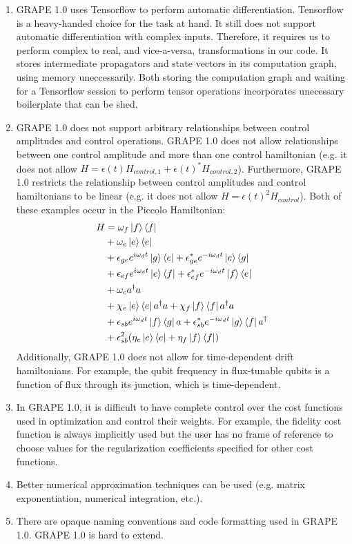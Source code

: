 \documentclass[letterpaper, 12pt]{article}
\begin{document}
\begin{enumerate}
\item GRAPE 1.0 uses Tensorflow to perform automatic differentiation. Tensorflow is a heavy-handed choice for the task at hand. It still does not support automatic differentiation with complex inputs. Therefore, it requires us to perform complex to real, and vice-a-versa, transformations in our code. It stores intermediate propagators and state vectors in its computation graph, using memory uneccessarily. Both storing the computation graph and waiting for a Tensorflow session to perform tensor operations incorporates unecessary boilerplate that can be shed.
  
\item GRAPE 1.0 does not support arbitrary relationships between control amplitudes and control operations. GRAPE 1.0 does not allow relationships between one control amplitude and more than one control hamiltonian (e.g. it does not allow $H = \epsilon(t)H_{control, 1} + \epsilon(t)^{*}H_{control, 2}$). Furthermore, GRAPE 1.0 restricts the relationship between control amplitudes and control hamiltonians to be linear (e.g. it does not allow $H = \epsilon(t)^{2}H_{control}$). Both of these examples occur in the Piccolo Hamiltonian:
\begin{align*}
  H &= \omega_{f}\ket{f}\bra{f} \\
  &+ \omega_{e}\ket{e}\bra{e}\\
  &+ \epsilon_{ge}e^{i\omega_{d}t}\ket{g}\bra{e} + \epsilon_{ge}^{*}e^{-i\omega_{d}t}\ket{e}\bra{g}\\
  &+ \epsilon_{ef}e^{i\omega_{d}t}\ket{e}\bra{f} + \epsilon_{ef}^{*}e^{-i\omega_{d}t}\ket{f}\bra{e}\\
  &+ \omega_{c}a^{\dagger}a\\
  &+ \chi_{e}\ket{e}\bra{e}a^{\dagger}a + \chi_{f}\ket{f}\bra{f}a^{\dagger}a\\
  &+ \epsilon_{sb}e^{i\omega_{d}t}\ket{f}\bra{g}a + \epsilon_{sb}^{*}e^{-i\omega_{d}t}\ket{g}\bra{f}a^{\dagger}\\
  &+ \epsilon_{sb}^{2}(\eta_{e}\ket{e}\bra{e} + \eta_{f}\ket{f}\bra{f})\\
\end{align*}
  Additionally, GRAPE 1.0 does not allow for time-dependent drift hamiltonians. For example, the qubit frequency in flux-tunable qubits is a function of flux through its junction, which is time-dependent.

\item In GRAPE 1.0, it is difficult to have complete control over the cost functions used in optimization and control their weights. For example, the fidelity cost function is always implicitly used but the user has no frame of reference to choose values for the regularization coefficients specified for other cost functions.
  
\item Better numerical approximation techniques can be used (e.g. matrix exponentiation, numerical integration, etc.).

\item There are opaque naming conventions and code formatting used in GRAPE 1.0. GRAPE 1.0 is hard to extend.
\end{enumerate}
\end{document}
